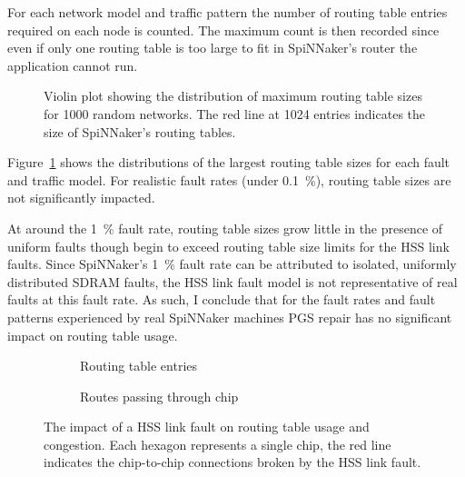 			For each network model and traffic pattern the number of routing table
			entries required on each node is counted. The maximum count is then
			recorded since even if only one routing table is too large to fit in
			SpiNNaker's router the application cannot run.
			
			\begin{figure}
				\center
				
				\caption[Routing table sizes for \num{1000} random networks.]%
				{Violin plot showing the distribution of maximum routing table
				sizes for \num{1000} random networks. The red line at \num{1024}
				entries indicates the size of SpiNNaker's routing tables.}
				\label{fig:routing-entries}
			\end{figure}
			
			Figure~\ref{fig:routing-entries} shows the distributions of the largest
			routing table sizes for each fault and traffic model. For realistic fault
			rates (under \SI{0.1}{\percent}), routing table sizes are not
			significantly impacted.
			
			At around the \SI{1}{\percent} fault rate, routing table sizes grow
			little in the presence of uniform faults though begin to exceed routing
			table size limits for the HSS link faults. Since SpiNNaker's
			\SI{1}{\percent} fault rate can be attributed to isolated, uniformly
			distributed SDRAM faults, the HSS link fault model is not representative
			of real faults at this fault rate. As such, I conclude that for the fault
			rates and fault patterns experienced by real SpiNNaker machines PGS
			repair has no significant impact on routing table usage.
			
			\begin{figure}
				\center
				\begin{subfigure}{0.48\linewidth}
					\center
					
					\caption{Routing table entries}
					\label{fig:hss-link-routing-table-usage}
				\end{subfigure}
				\begin{subfigure}{0.48\linewidth}
					\center
					
					\caption{Routes passing through chip}
					\label{fig:hss-link-resource-usage}
				\end{subfigure}
				
				\caption[The impact of a HSS link fault.]%
				{The impact of a HSS link fault on routing table usage and
				congestion. Each hexagon represents a single chip, the red line
				indicates the chip-to-chip connections broken by the HSS link fault.}
				\label{fig:hss-link-usage}
			\end{figure}
			
